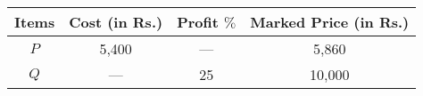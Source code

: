 \begin{center}
\begin{tabular}{|c|c|c|c|}
\hline
Items & Cost (in Rs.) & Profit $\%$ & Marked Price (in Rs.) \\ 
\hline
$P$ & 5,400 & --- & 5,860 \\ 

$Q$ & --- & 25 & 10,000 \\ 
\hline
\end{tabular}
\end{center}

